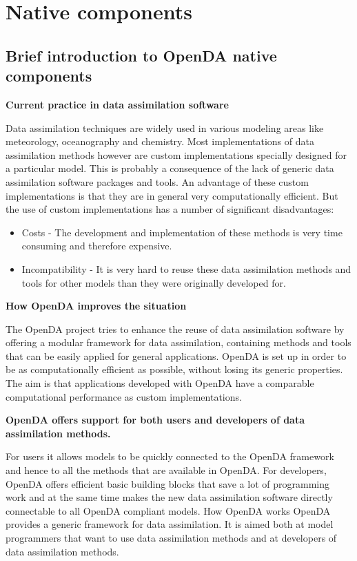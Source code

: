 \section{Native components}

\subsection{Brief introduction to OpenDA native components}
\textbf{Current practice in data assimilation software}

Data assimilation techniques are widely used in various modeling areas like meteorology, oceanography and chemistry. Most implementations of data assimilation methods however are custom implementations specially designed for a particular model. This is probably a consequence of the lack of generic data assimilation software packages and tools. An advantage of these custom implementations is that they are in general very computationally efficient. But the use of custom implementations has a number of significant disadvantages:

\begin{itemize}
\item Costs - The development and implementation of these methods is very time consuming and therefore expensive.
\item Incompatibility - It is very hard to reuse these data assimilation methods and tools for other models than they were originally developed for. 
\end{itemize}
    
\textbf{How OpenDA improves the situation}

The OpenDA project tries to enhance the reuse of data assimilation software by offering a modular framework for data assimilation, containing methods and tools that can be easily applied for general applications. OpenDA is set up in order to be as computationally efficient as possible, without losing its generic properties. The aim is that applications developed with OpenDA have a comparable computational performance as custom implementations.

\textbf{OpenDA offers support for both users and developers of data assimilation methods.}

For users it allows models to be quickly connected to the OpenDA framework and hence to all the methods that are available in OpenDA. For developers, OpenDA offers efficient basic building blocks that save a lot of programming work and at the same time makes the new data assimilation software directly connectable to all OpenDA compliant models.
How OpenDA works
OpenDA provides a generic framework for data assimilation. It is aimed both at model programmers that want to use data assimilation methods and at developers of data assimilation methods.

